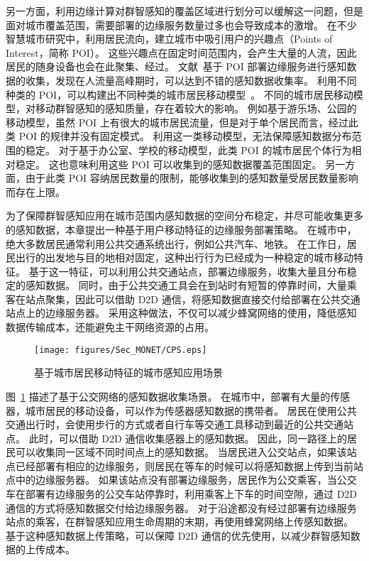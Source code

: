 另一方面，利用边缘计算对群智感知的覆盖区域进行划分可以缓解这一问题，但是面对城市覆盖范围，需要部署的边缘服务数量过多也会导致成本的激增。
在不少智慧城市研究中，利用居民流向，建立城市中吸引用户的兴趣点（Points of Interest，简称 POI）。
这些兴趣点在固定时间范围内，会产生大量的人流，因此居民的随身设备也会在此聚集、经过。
文献~基于 POI 部署边缘服务进行感知数据的收集，发现在人流量高峰期时，可以达到不错的感知数据收集率。
利用不同种类的 POI，可以构建出不同种类的城市居民移动模型~\cite{CNKI:XiongOMCS}。
不同的城市居民移动模型，对移动群智感知的感知质量，存在着较大的影响。
例如基于游乐场、公园的移动模型，虽然 POI 上有很大的城市居民流量，但是对于单个居民而言，经过此类 POI 的规律并没有固定模式。
利用这一类移动模型，无法保障感知数据分布范围的稳定。
对于基于办公室、学校的移动模型，此类 POI 的城市居民个体行为相对稳定。
这也意味利用这些 POI 可以收集到的感知数据覆盖范围固定。
另一方面，由于此类 POI 容纳居民数量的限制，能够收集到的感知数量受居民数量影响而存在上限。

为了保障群智感知应用在城市范围内感知数据的空间分布稳定，并尽可能收集更多的感知数据，本章提出一种基于用户移动特征的边缘服务部署策略。
在城市中，绝大多数居民通常利用公共交通系统出行，例如公共汽车、地铁。
在工作日，居民出行的出发地与目的地相对固定，这种出行行为已经成为一种稳定的城市移动特征。
基于这一特征，可以利用公共交通站点，部署边缘服务，收集大量且分布稳定的感知数据。
同时，由于公共交通工具会在到站时有短暂的停靠时间，大量乘客在站点聚集，因此可以借助 D2D 通信，将感知数据直接交付给部署在公共交通站点上的边缘服务器。
采用这种做法，不仅可以减少蜂窝网络的使用，降低感知数据传输成本，还能避免主干网络资源的占用。

\begin{figure}[!h]
\centering
\vspace{-1em}
\texttt{[image: figures/Sec\_MONET/CPS.eps]}
\vspace{-0.5em}
\caption{基于城市居民移动特征的城市感知应用场景}
\vspace{-1.5em}
\label{Figure_edge}
\end{figure}

图~\ref{Figure_edge} 描述了基于公交网络的感知数据收集场景。
在城市中，部署有大量的传感器，城市居民的移动设备，可以作为传感器感知数据的携带者。
居民在使用公共交通出行时，会使用步行的方式或者自行车等交通工具移动到最近的公共交通站点。
此时，可以借助 D2D 通信收集感器上的感知数据。
因此，同一路径上的居民可以收集同一区域不同时间点上的感知数据。
当居民进入公交站点，如果该站点已经部署有相应的边缘服务，则居民在等车的时候可以将感知数据上传到当前站点中的边缘服务器。
如果该站点没有部署边缘服务，居民作为公交乘客，当公交车在部署有边缘服务的公交车站停靠时，利用乘客上下车的时间空隙，通过 D2D 通信的方式将感知数据交付给边缘服务器。
对于沿途都没有经过部署有边缘服务站点的乘客，在群智感知应用生命周期的末期，再使用蜂窝网络上传感知数据。
基于这种感知数据上传策略，可以保障 D2D 通信的优先使用，以减少群智感知数据的上传成本。

